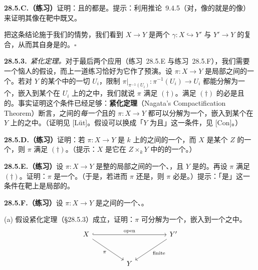 \textbf{28.5.C.（练习）}\quad 证明：\trProper{}且\trQuasicompact{}的\trOpenEmbedding{}都是\trClosedEmbedding。提示：利用\mbox{推论~9.4.5}（对\trQuasicompact{}\trMorphism，像的\trClosure{}就是\trClosure{}的像）来证明其像在靶中既\trOpen{}又\trClosed。

把这条结论施于我们的情势，我们看到 $X\to Y$ 是两个\trFinite\trMorphism{} $\gamma\colon X\hookrightarrow Y'$ 与 $Y'\to Y$ 的复合，从而其自身是\trFinite{}的。\hfill$\square$

\textbf{28.5.3.}\ \emph{\trNagata{}紧化定理。}\quad 对于最后两个应用（\mbox{练习~28.5.E} 与\mbox{练习~28.5.F}），我们需要一个恼人的假设，而上一道练习恰好为它作了预演。设 $\pi\colon X\to Y$ 是局部\trNoether{}\trScheme{}之间的一个\trMorphism。若对 $Y$ 的某个\trOpenCover{}中的一切\trAffine\trOpenSet{} $U_i$，限制 $\pi|_{\pi^{-1}(U_i)}\colon\pi^{-1}(U_i)\to U_i$ 都能分解为一个\trOpenEmbedding{}，嵌入到某个在 $U_i$ 上\trProper{}的\trScheme{}之中，我们就说 $\pi$ 满足 $(\dagger)$。满足 $(\dagger)$ 的\trMorphism{}必是\trSeparated{}且\trFiniteType{}的。事实证明这个条件已经足够：\textbf{\trNagata{}紧化定理}（Nagata's Compactification Theorem）断言，\trNoether{}\trScheme{}之间的\emph{每一个}\trSeparated{}且\trFiniteType{}的\trMorphism{} $\pi\colon X\to Y$ 都可以分解为一个\trDense\trOpenEmbedding{}，嵌入到某个在 $Y$ 上\trProper{}的\trScheme{}之中。（证明见 [Lüt]。\trNoether{}假设可以换成「$Y$ 为\trQuasicompact{}且\trQuasiSeparated{}」这一条件，见 [Con]。）

\textbf{28.5.D.（练习）}\quad 证明：若 $\pi\colon X\to Y$ 是 $k$ 上的\trVariety{}之间的一个\trMorphism，而 $X$ 是某个\trProper\trVariety{} $Z$ 的一个\trOpenSubset，则 $\pi$ 满足 $(\dagger)$。（提示：$X$ 是它在 $Z\times_k Y$ 中的\trClosure{}的一个\trOpenSubscheme。）

\textbf{28.5.E.（练习）}\quad 设 $\pi\colon X\to Y$ 是整的局部\trNoether{}\trScheme{}之间的一个\trQuasifinite{}、\trBirational{}\trMorphism，且 $Y$ 是\trNormal{}的。再设 $\pi$ 满足 $(\dagger)$。证明：$\pi$ 是一个\trOpenEmbedding。（于是，若进而 $\pi$ 还是\trBijection，则 $\pi$ 必是\trIsomorphism。）提示：「是\trOpenEmbedding」这一条件在靶上是局部的。

\textbf{28.5.F.（练习）}\quad 设 $\pi\colon X\to Y$ 是\trNoether{}\trScheme{}之间的一个\trSeparated、\trQuasifinite\trMorphism。

(a) 假设\trNagata{}紧化定理（\S28.5.3）成立，证明：$\pi$ 可分解为一个\trOpenEmbedding{}，嵌入到一个\trFinite\trMorphism{}之中。
\[
\begin{tikzcd}[row sep=2.8em, column sep=4.5em]
X \ar[rr, hook, "\text{open}"] \ar[dr, "\pi"'] && Y' \ar[dl, "\text{finite}"] \\
& Y &
\end{tikzcd}
\]

